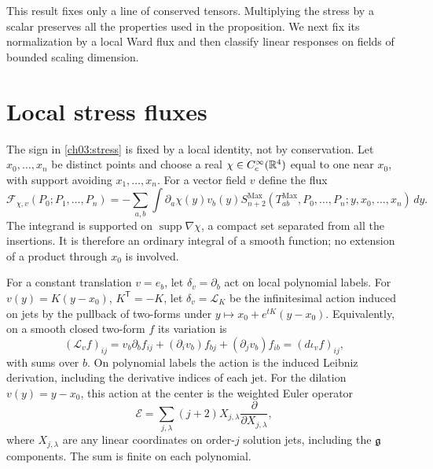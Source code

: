 This result fixes only a line of conserved tensors. Multiplying the
stress by a scalar preserves all the properties used in the proposition.
We next fix its normalization by a local Ward flux and then classify
linear responses on fields of bounded scaling dimension.


\section{Local stress fluxes}\label{ch03:ward}

The sign in \eqref{ch03:stress} is fixed by a local identity, not by
conservation. Let $x_0,\ldots,x_n$ be distinct points and choose a real
$\chi\in C_c^\infty(\mathbb R^4)$ equal to one near $x_0$, with support
avoiding $x_1,\ldots,x_n$. For a vector field $v$ define the flux
\begin{equation}\label{ch03:flux}
 \mathcal F_{\chi,v}(P_0;P_1,\ldots,P_n)
 =-\sum_{a,b}\int \partial_a\chi(y)v_b(y)
 S_{n+2}^{\mathrm{Max}}(T^{\mathrm{Max}}_{ab},P_0,\ldots,P_n;
                       y,x_0,\ldots,x_n)\,dy.
\end{equation}
The integrand is supported on $\operatorname{supp}\nabla\chi$, a compact set separated from all the insertions.
It is therefore an ordinary integral of a smooth function; no extension
of a product through $x_0$ is involved.

For a constant translation $v=e_b$, let $\delta_v=\partial_b$ act on
local polynomial labels. For $v(y)=K(y-x_0)$, $K^{\mathsf T}=-K$,
let $\delta_v=\mathcal L_K$ be the infinitesimal action induced on jets
by the pullback of two-forms under $y\mapsto x_0+e^{tK}(y-x_0)$.
Equivalently, on a smooth closed two-form $f$ its variation is
\begin{equation}\label{ch03:lie}
 (\mathcal L_v f)_{ij}
 =v_b\partial_bf_{ij}+ (\partial_i v_b)f_{bj}
                            +(\partial_jv_b)f_{ib}
 =(d\iota_v f)_{ij},
\end{equation}
with sums over $b$. On polynomial labels the action is the induced
Leibniz derivation, including the derivative indices of each jet.
For the dilation $v(y)=y-x_0$, this action at the center is the weighted Euler
operator
\begin{equation}\label{ch03:weight}
 \mathscr E=\sum_{j,\lambda}(j+2)X_{j,\lambda}
                                  \frac{\partial}{\partial X_{j,\lambda}},
\end{equation}
where $X_{j,\lambda}$ are any linear coordinates on order-$j$ solution
jets, including the $\mathfrak g$ components. The sum is finite on each polynomial.

